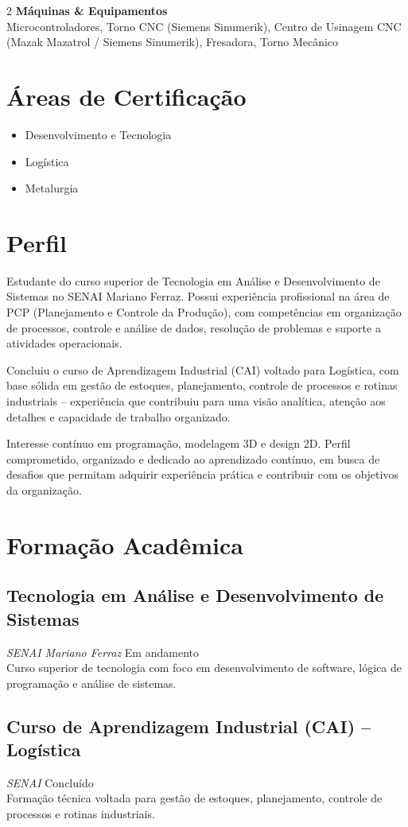 \documentclass[10.5pt,a4paper]{article}
\newcommand{\itemExperiencia}[4]{%
  \subsection*{#1}
  {\small\color{corsecundaria}\textit{#2} \hfill #3}\\[0.15em]
  {\small #4}
  \vspace{0.5em}
}
\newcommand{\blocoHabilidade}[2]{%
  {\small\bfseries\color{corsecundaria} #1}\\[0.1em]
  {\small #2}\par\vspace{0.5em}
}
\begin{document}
\begin{paracol}{2}
\blocoHabilidade{Máquinas \& Equipamentos}{Microcontroladores, Torno CNC (Siemens Sinumerik), Centro de Usinagem CNC (Mazak Mazatrol / Siemens Sinumerik), Fresadora, Torno Mecânico}

\section*{Áreas de Certificação}
\begin{itemize}[leftmargin=1.1em, itemsep=0.1em, label=\textcolor{corprincipal}{\small\faAngleRight}]
  \small
  \item Desenvolvimento e Tecnologia
  \item Logística
  \item Metalurgia
\end{itemize}

\switchcolumn
\section*{Perfil}
{\small
Estudante do curso superior de Tecnologia em Análise e Desenvolvimento de Sistemas
no SENAI Mariano Ferraz. Possui experiência profissional na área de PCP
(Planejamento e Controle da Produção), com competências em organização de
processos, controle e análise de dados, resolução de problemas e suporte a
atividades operacionais.

Concluiu o curso de Aprendizagem Industrial (CAI) voltado para Logística, com
base sólida em gestão de estoques, planejamento, controle de processos e
rotinas industriais -- experiência que contribuiu para uma visão analítica,
atenção aos detalhes e capacidade de trabalho organizado.

Interesse contínuo em programação, modelagem 3D e design 2D. Perfil
comprometido, organizado e dedicado ao aprendizado contínuo, em busca de
desafios que permitam adquirir experiência prática e contribuir com os
objetivos da organização.
}

\section*{Formação Acadêmica}
\itemExperiencia{Tecnologia em Análise e Desenvolvimento de Sistemas}
  {SENAI Mariano Ferraz}{Em andamento}
  {Curso superior de tecnologia com foco em desenvolvimento de software, lógica de programação e análise de sistemas.}

\itemExperiencia{Curso de Aprendizagem Industrial (CAI) -- Logística}
  {SENAI}{Concluído}
  {Formação técnica voltada para gestão de estoques, planejamento, controle de processos e rotinas industriais.}


\end{paracol}
\end{document}
